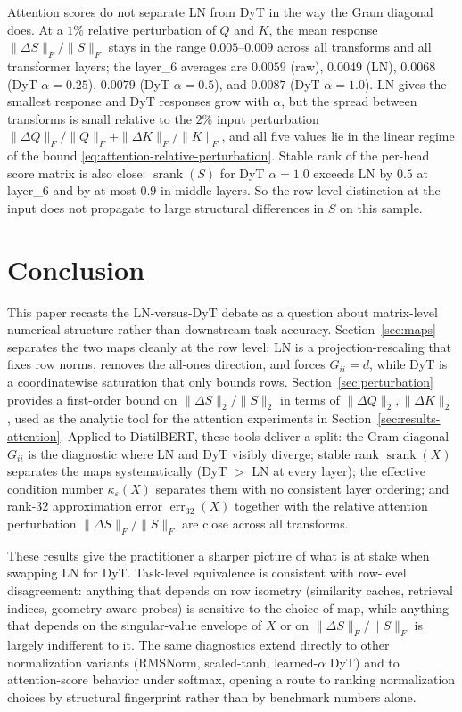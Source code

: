 \documentclass[11pt]{article}
\newcommand{\srank}{\operatorname{srank}}
\newcommand{\kappaeff}{\kappa_{\varepsilon}}
\begin{document}
Attention scores do not separate LN from DyT in the way the Gram diagonal does. At a $1\%$ relative perturbation of $Q$ and $K$, the mean response $\|\Delta S\|_F/\|S\|_F$ stays in the range $0.005$--$0.009$ across all transforms and all transformer layers; the \textsf{layer\_6} averages are $0.0059$ (raw), $0.0049$ (LN), $0.0068$ (DyT $\alpha=0.25$), $0.0079$ (DyT $\alpha=0.5$), and $0.0087$ (DyT $\alpha=1.0$). LN gives the smallest response and DyT responses grow with $\alpha$, but the spread between transforms is small relative to the $2\%$ input perturbation $\|\Delta Q\|_F/\|Q\|_F+\|\Delta K\|_F/\|K\|_F$, and all five values lie in the linear regime of the bound \eqref{eq:attention-relative-perturbation}. Stable rank of the per-head score matrix is also close: $\srank(S)$ for DyT $\alpha=1.0$ exceeds LN by $0.5$ at \textsf{layer\_6} and by at most $0.9$ in middle layers. So the row-level distinction at the input does not propagate to large structural differences in $S$ on this sample.

\section{Conclusion}

This paper recasts the LN-versus-DyT debate as a question about matrix-level numerical structure rather than downstream task accuracy. Section~\ref{sec:maps} separates the two maps cleanly at the row level: LN is a projection-rescaling that fixes row norms, removes the all-ones direction, and forces $G_{ii}=d$, while DyT is a coordinatewise saturation that only bounds rows. Section~\ref{sec:perturbation} provides a first-order bound on $\|\Delta S\|_2/\|S\|_2$ in terms of $\|\Delta Q\|_2,\|\Delta K\|_2$, used as the analytic tool for the attention experiments in Section~\ref{sec:results-attention}. Applied to DistilBERT, these tools deliver a split: the Gram diagonal $G_{ii}$ is the diagnostic where LN and DyT visibly diverge; stable rank $\srank(X)$ separates the maps systematically (DyT $>$ LN at every layer); the effective condition number $\kappaeff(X)$ separates them with no consistent layer ordering; and rank-$32$ approximation error $\operatorname{err}_{32}(X)$ together with the relative attention perturbation $\|\Delta S\|_F/\|S\|_F$ are close across all transforms.

These results give the practitioner a sharper picture of what is at stake when swapping LN for DyT. Task-level equivalence is consistent with row-level disagreement: anything that depends on row isometry (similarity caches, retrieval indices, geometry-aware probes) is sensitive to the choice of map, while anything that depends on the singular-value envelope of $X$ or on $\|\Delta S\|_F/\|S\|_F$ is largely indifferent to it. The same diagnostics extend directly to other normalization variants (RMSNorm, scaled-tanh, learned-$\alpha$ DyT) and to attention-score behavior under softmax, opening a route to ranking normalization choices by structural fingerprint rather than by benchmark numbers alone.
\end{document}
